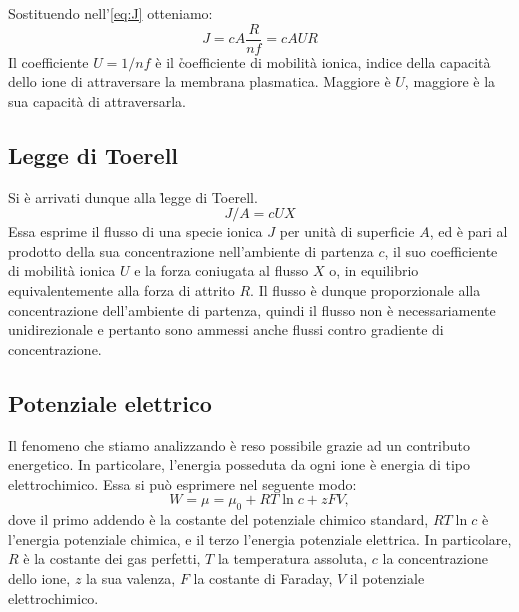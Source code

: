 
Sostituendo nell'\autoref{eq:J} otteniamo:
\begin{equation*}
    J = c A \frac{R}{n f} = c A U R
\end{equation*}
Il coefficiente $U = 1 / nf $ è il \h{coefficiente di mobilità ionica}, indice della capacità dello ione di attraversare la membrana plasmatica. Maggiore è $U$, maggiore è la sua capacità di attraversarla.

\subsection{Legge di Toerell}
Si è arrivati dunque alla \h{legge di Toerell}.
\begin{equation}
    \label{eq:toerell}
    \boxed{
    J/A = c U X
    }
\end{equation}
Essa esprime il flusso di una specie ionica $J$ per unità di superficie $A$, ed è pari al prodotto della sua concentrazione nell'ambiente di partenza $c$, il suo coefficiente di mobilità ionica $U$ e la forza coniugata al flusso $X$ o, in equilibrio equivalentemente alla forza di attrito $R$. Il flusso è dunque proporzionale alla concentrazione dell’ambiente di partenza, quindi il flusso non è necessariamente unidirezionale e pertanto sono ammessi anche flussi contro gradiente di concentrazione.



\subsection{Potenziale elettrico}
Il fenomeno che stiamo analizzando è reso possibile grazie ad un contributo energetico. In particolare, l'energia posseduta da ogni ione è energia di tipo elettrochimico. Essa si può esprimere nel seguente modo:
\begin{equation}
    \label{eq:mu}
    W = \mu = \mu_0 + RT \ln{c} + zFV,
\end{equation}
dove il primo addendo è la costante del potenziale chimico standard, $RT \ln{c}$ è l'energia potenziale chimica, e il terzo l'energia potenziale elettrica. In particolare, $R$ è la costante dei gas perfetti, $T$ la temperatura assoluta, $c$ la concentrazione dello ione, $z$ la sua valenza, $F$ la costante di Faraday, $V$ il potenziale elettrochimico.

